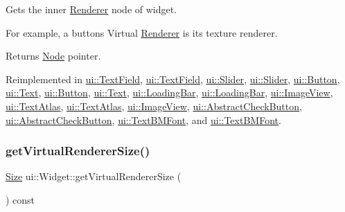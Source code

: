 Gets the inner \hyperlink{classRenderer}{Renderer} node of widget.

For example, a button\textquotesingle{}s Virtual \hyperlink{classRenderer}{Renderer} is it\textquotesingle{}s texture renderer.

\begin{DoxyReturn}{Returns}
\hyperlink{classNode}{Node} pointer. 
\end{DoxyReturn}


Reimplemented in \hyperlink{classui_1_1TextField_a517f950a59caa4ec02a9245beb6d7283}{ui\+::\+Text\+Field}, \hyperlink{classui_1_1TextField_a63b989aa3b2a11854b1a7e2bf4659a40}{ui\+::\+Text\+Field}, \hyperlink{classui_1_1Slider_a72c8715bd62b7eda0e733c66e008c712}{ui\+::\+Slider}, \hyperlink{classui_1_1Slider_a801fd6363b412ecc766abe2eea7924b6}{ui\+::\+Slider}, \hyperlink{classui_1_1Button_ace7b0c2ed9f13afbc3f5979cf7a84747}{ui\+::\+Button}, \hyperlink{classui_1_1Text_ab595ff0bd28a29005e7f60ea662e7640}{ui\+::\+Text}, \hyperlink{classui_1_1Button_afa2bf5862c2e1893a34fbf88e5294fa3}{ui\+::\+Button}, \hyperlink{classui_1_1Text_a4a1e00d5f586e01d94c8dec146741dce}{ui\+::\+Text}, \hyperlink{classui_1_1LoadingBar_a7c47d606b1f71e090a3d9d2a904dbd92}{ui\+::\+Loading\+Bar}, \hyperlink{classui_1_1LoadingBar_a20c987a6a4fa0b50cb1ff3cf7cfd17b6}{ui\+::\+Loading\+Bar}, \hyperlink{classui_1_1ImageView_af98c832737c94dd9113967df15854318}{ui\+::\+Image\+View}, \hyperlink{classui_1_1TextAtlas_ad507ef83a1b5570819a24afe337d2835}{ui\+::\+Text\+Atlas}, \hyperlink{classui_1_1TextAtlas_a7341add4e53083db9de33dd5ab7eb0bd}{ui\+::\+Text\+Atlas}, \hyperlink{classui_1_1ImageView_adffa0c091b7d528ffc50c7b117be61bc}{ui\+::\+Image\+View}, \hyperlink{classui_1_1AbstractCheckButton_a4affc93c2631571aebcc499ddc2f0f62}{ui\+::\+Abstract\+Check\+Button}, \hyperlink{classui_1_1AbstractCheckButton_a51819285d8bfbe4b135dd09b8c382618}{ui\+::\+Abstract\+Check\+Button}, \hyperlink{classui_1_1TextBMFont_a7a78528934f644fac429d3107e8b2f94}{ui\+::\+Text\+B\+M\+Font}, and \hyperlink{classui_1_1TextBMFont_ac9d8900e87de50e47d330bf4cf3dece1}{ui\+::\+Text\+B\+M\+Font}.

\mbox{\label{classui_1_1Widget_a2ed0d41565593f78dc59c975d58a869e}} 
\subsubsection{\texorpdfstring{get\+Virtual\+Renderer\+Size()}{getVirtualRendererSize()}\hspace{0.1cm}{\footnotesize\ttfamily [1/2]}}
{\footnotesize\ttfamily \hyperlink{classSize}{Size} ui\+::\+Widget\+::get\+Virtual\+Renderer\+Size (\begin{DoxyParamCaption}{ }\end{DoxyParamCaption}) const\hspace{0.3cm}{\ttfamily [virtual]}}

